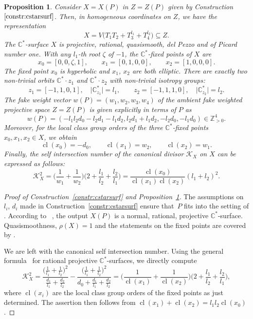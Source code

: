 \documentclass[10pt,a4paper]{amsart}
\newtheorem{prop}[thm]{Proposition}
\theoremstyle{definition}
\def\CC{{\mathbb C}}
\def\ZZ{{\mathbb Z}}
\DeclareMathOperator{\cl}{cl}
\begin{document}
\begin{prop}
\label{prop:cstarsurf}
Consider $X=X(P)$ in $Z=Z(P)$ given by
Construction~$\ref{constr:cstarsurf}$.
Then, in homogeneous coordinates on $Z$,
we have the representation
\[
X
 =
V\bigl(T_1T_2 + T_3^{l_1} + T_4^{l_2}\bigr)
 \subseteq
Z.
\]
The $\CC^*$-surface $X$ is projective, rational,
quasismooth, del Pezzo and of Picard number one.
With any $l_1$-th root $\zeta$ of $-1$, the $\CC^*$-fixed
points of $X$ are
\[
x_0 = [0,0,\zeta,1],
\qquad
x_1 = [0,1,0,0],
\qquad
x_2 = [1,0,0,0].
\]
The fixed point $x_0$ is hyperbolic and $x_1$, $x_2$ are both
elliptic.
There are exactly two non-trivial orbits $\CC^* \cdot z_1$
and $\CC^* \cdot z_2$ with non-trivial isotropy groups:
\[
z_1 = [-1,1,0,1], \quad
\vert \CC^*_{z_1} \vert = l_1,
\qquad
z_2 = [-1,1,1,0], \quad
\vert \CC^*_{z_2} \vert = l_2.
\]
The fake weight vector $w(P) =(w_1,w_2,w_3,w_4)$
of the ambient fake weighted projective space $Z = Z(P)$
is given explicitly in terms of $P$ as
\[
w(P)
 =
(-l_1l_2d_0 - l_2d_1 - l_1d_2, l_2d_1 + l_1d_2, - l_2d_0, -l_1d_0)
 \in
\ZZ_{>0}^4.
\]
Moreover, for the local class group orders of the three
$\CC^*$-fixed points $x_0,x_1,x_2 \in X$, we obtain
\[
\cl(x_0) = -d_0,
\qquad
\cl(x_1) = w_2,
\qquad
\cl(x_2) = w_1.
\]
Finally, the self intersection number of the canonical
divisor $\mathcal{K}_X$ on $X$ can be expressed as
follows:
\[
\mathcal{K}_X^2
 =
\biggl( \frac{1}{w_1} + \frac{1}{w_2} \biggr)
\biggl(2 + \frac{l_1}{l_2} + \frac{l_2}{l_1} \biggr)
 =
\frac{\cl(x_0)}{\cl(x_1)\cl(x_2)} (l_1+l_2)^2.
\]
\end{prop}


\begin{proof}[Proof of Construction~\ref{constr:cstarsurf}
and Proposition~\ref{prop:cstarsurf}]
The assumptions on $l_i$, $d_i$ made in
Construction~\ref{constr:cstarsurf}
ensure that~$P$ fits into the setting of
\cite[Construction~4.2]{HaHaHaSp}.
According to~ \cite[Proposition~4.5]{HaHaHaSp}, the
output $X(P)$ is a normal, rational,
projective $\CC^*$-surface.
Quasismoothness, $\rho(X)=1$ and the
statements on the fixed points are covered
by \cite[Propositions~4.9, 4.15 and~5.1]{HaHaHaSp}.

We are left with the canonical self intersection number.
Using the general formula~\cite[Proposition~7.9]{HaHaSp}
for rational projective $\CC^*$-surfaces, we directly
compute
\[
\mathcal{K}_X^2
 =
\frac{\bigl(\frac{1}{l_1}+\frac{1}{l_2}\bigr)^2}{\frac{d_1}{l_1}+\frac{d_2}{l_2}}
 -
\frac{\bigl(\frac{1}{l_1}+\frac{1}{l_2}\bigr)^2}{d_0+\frac{d_1}{l_1}+\frac{d_2}{l_2}}
 =
\biggl(
\frac{1}{\cl(x_1)}
 +
\frac{1}{\cl(x_2)}
\biggr)
\biggl(2+\frac{l_1}{l_2}+\frac{l_2}{l_1}\biggr),
\]
where $\cl(x_i)$ are the local class group orders
of the fixed points as just determined.
The assertion then follows from
$\cl(x_1)+\cl(x_2)= l_1l_2\cl(x_0)$.
\end{proof}
\end{document}
